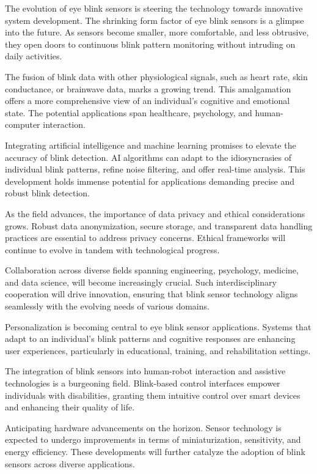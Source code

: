 \documentclass[conference]{IEEEtran}
\begin{document}
The evolution of eye blink sensors is steering the technology towards innovative system development. The shrinking form factor of eye blink sensors is a glimpse into the future. As sensors become smaller, more comfortable, and less obtrusive, they open doors to continuous blink pattern monitoring without intruding on daily activities. 

The fusion of blink data with other physiological signals, such as heart rate, skin conductance, or brainwave data, marks a growing trend. This amalgamation offers a more comprehensive view of an individual's cognitive and emotional state. The potential applications span healthcare, psychology, and human-computer interaction.

Integrating artificial intelligence and machine learning promises to elevate the accuracy of blink detection. AI algorithms can adapt to the idiosyncrasies of individual blink patterns, refine noise filtering, and offer real-time analysis. This development holds immense potential for applications demanding precise and robust blink detection.

As the field advances, the importance of data privacy and ethical considerations grows. Robust data anonymization, secure storage, and transparent data handling practices are essential to address privacy concerns. Ethical frameworks will continue to evolve in tandem with technological progress.

Collaboration across diverse fields spanning engineering, psychology, medicine, and data science, will become increasingly crucial. Such interdisciplinary cooperation will drive innovation, ensuring that blink sensor technology aligns seamlessly with the evolving needs of various domains.

Personalization is becoming central to eye blink sensor applications. Systems that adapt to an individual's blink patterns and cognitive responses are enhancing user experiences, particularly in educational, training, and rehabilitation settings.

The integration of blink sensors into human-robot interaction and assistive technologies is a burgeoning field. Blink-based control interfaces empower individuals with disabilities, granting them intuitive control over smart devices and enhancing their quality of life.

Anticipating hardware advancements on the horizon. Sensor technology is expected to undergo improvements in terms of miniaturization, sensitivity, and energy efficiency. These developments will further catalyze the adoption of blink sensors across diverse applications.
\end{document}
